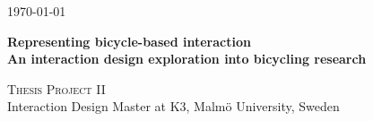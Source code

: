 \begin{titlepage}
\begin{center}
{\large \today}
\vspace{1cm}
\vfill
\begin{minipage}{0.86\textwidth}
\begin{flushleft} \large

\vspace*{0.4cm}
\begin{spacing}{1.0}
{ \huge \bfseries Representing bicycle-based interaction\\[0.4cm]\large{An interaction design exploration into bicycling research}}
\end{spacing}
\vspace*{1.5cm}
\textsc{\Large Thesis Project II}\\Interaction Design Master at K3, Malmö University, Sweden
\end{flushleft}
\end{minipage}

\end{center}
\end{titlepage}
